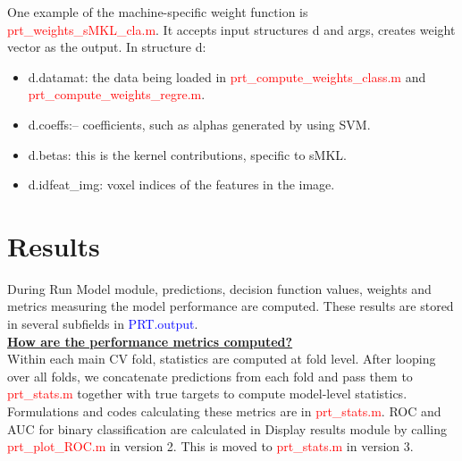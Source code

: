 \begin{enumerate}
One example of the machine-specific weight function is \textcolor{red}{prt\_weights\_sMKL\_cla.m}. It accepts input structures d and args, creates weight vector as the output. In structure d:

\begin{itemize}
\item d.datamat: the data being loaded in \textcolor{red}{prt\_compute\_weights\_class.m} and \textcolor{red}{prt\_compute\_weights\_regre.m}.
\item d.coeffs:– coefficients, such as alphas generated by using SVM.
\item d.betas: this is the kernel contributions, specific to sMKL.
\item d.idfeat\_img: voxel indices of the features in the image.
\end{itemize}

\end{enumerate}







\section{Results}

During Run Model module, predictions, decision function values, weights and metrics measuring the model performance are computed. These results are stored in several subfields in \textcolor{blue}{PRT.output}.
\\

\noindent \underline{\textbf{How are the performance metrics computed?}}
\\

Within each main CV fold, statistics are computed at fold level. After looping over all folds, we concatenate predictions from each fold and pass them to \textcolor{red}{prt\_stats.m} together with true targets to compute model-level statistics. Formulations and codes calculating these metrics are in \textcolor{red}{prt\_stats.m}. ROC and AUC for binary classification are calculated in Display results module by calling \textcolor{red}{prt\_plot\_ROC.m} in version 2. This is moved to \textcolor{red}{prt\_stats.m} in version 3.



